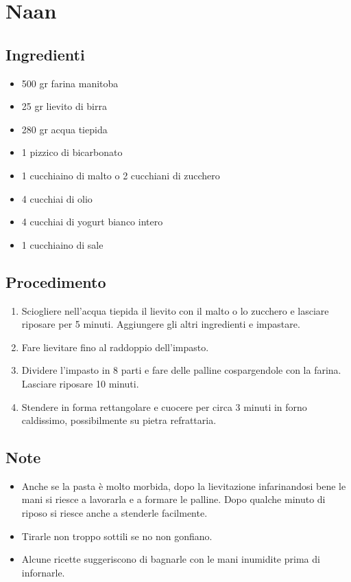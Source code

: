 \section{Naan}
\subsection{Ingredienti}
\begin{itemize}
\item 500 gr farina manitoba  
\item 25 gr lievito di birra  
\item 280 gr acqua tiepida  
\item 1 pizzico di bicarbonato  
\item 1 cucchiaino di malto o 2 cucchiani di zucchero  
\item 4 cucchiai di olio  
\item 4 cucchiai di yogurt bianco intero  
\item 1 cucchiaino di sale
\end{itemize}
\subsection{Procedimento}
\begin{enumerate}
\item  Sciogliere nell'acqua tiepida il lievito con il malto o lo zucchero e lasciare riposare per 5 minuti. Aggiungere gli altri ingredienti e impastare.  
\item  Fare lievitare fino al raddoppio dell'impasto.  
\item  Dividere l'impasto in 8 parti e fare delle palline cospargendole con la farina. Lasciare riposare 10 minuti.  
\item  Stendere in forma rettangolare e cuocere per circa 3 minuti in forno caldissimo, possibilmente su pietra refrattaria. 
\end{enumerate}
\subsection{Note}
\begin{itemize}
\item Anche se la pasta è molto morbida, dopo la lievitazione infarinandosi bene le mani si riesce a lavorarla e a formare le palline. Dopo qualche minuto di riposo si riesce anche a stenderle facilmente.  
\item Tirarle non troppo sottili se no non gonfiano.  
\item Alcune ricette suggeriscono di bagnarle con le mani inumidite prima di infornarle.
\end{itemize}
